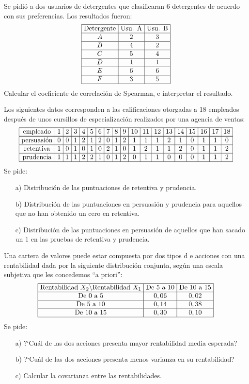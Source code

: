 \documentclass[12pt]{article}
\begin{document}
\begin{prob}
{Se pidió a dos usuarios de detergentes que clasificaran 6
detergentes de acuerdo con sus preferencias. Los resultados
fueron:
$$\vbox{\halign{\offinterlineskip\strut\vrule\ $#$ &\vrule
\ $#$ &\vrule\ $#$ \vrule\cr\noalign{\hrule}
\hbox{Detergente}&\hbox{Usu. A}&\hbox{Usu. B}\cr\noalign{\hrule}
A&2&3\cr\noalign{\hrule}B&4&2\cr\noalign{\hrule}
C&5&4\cr\noalign{\hrule}D&1&1\cr\noalign{\hrule}
E&6&6\cr\noalign{\hrule}F&3&5\cr\noalign{\hrule}}}$$ Calcular el
coeficiente de correlación de Spearman, e interpretar el
resultado.}
\end{prob}

\begin{prob}
{Los siguientes datos corresponden a las calificaciones otorgadas
a 18 empleados después de unos cursillos de especialización
realizados por una agencia de ventas:
$$\vbox{\halign{\offinterlineskip\strut\vrule\ # &\vrule\ $#$
&\vrule\ $#$ &\vrule\ $#$ &\vrule\ $#$ &\vrule\ $#$ &\vrule\ $#$
 &\vrule\ $#$ &\vrule\ $#$ &\vrule\ $#$ &\vrule\ $#$ &\vrule\ $#$
 &\vrule\ $#$ &\vrule\ $#$ &\vrule\ $#$ &\vrule\ $#$ &\vrule\ $#$
 &\vrule\ $#$ &\vrule\ $#$ \vrule\cr\noalign{\hrule}
empleado&1&2&3&4&5&6&7&8&9&10&11&12&13&14&15&16&17&18
\cr\noalign{\hrule}\noalign{\hrule}persuasión&0&0&1&2&1&2&0&1&2&1&1&1&2&1&0&1&1&0
\cr\noalign{\hrule}retentiva&1&0&1&0&1&0&2&1&0&1&2&1&1&2&0&1&1&2
\cr\noalign{\hrule}prudencia&1&1&1&2&2&1&0&1&2&0&1&1&0&0&0&1&1&2
\cr\noalign{\hrule}}}$$ Se pide:
\begin{itemize}
\item[a)] {Distribución de las puntuaciones de retentiva y prudencia.}
\item[b)] {Distribución de las puntuaciones en persuasión y prudencia
para aquellos que no han obtenido un cero en retentiva.}
\item[c)] {Distribución de las puntuaciones en persuasión  de aquellos
que han sacado  un 1 en las pruebas de retentiva y prudencia.}
\end{itemize}
}
\end{prob}

\begin{prob}
{Una cartera de valores puede estar compuesta por dos tipos d e acciones con una
rentabilidad dada por la siguiente distribución conjunta, según una escala subjetiva que
les concedemos ``a priori'':
$$\vbox{\halign{\offinterlineskip\strut\vrule\ $#$ &\vrule
\ $#$ &\vrule\ $#$ \vrule\cr\noalign{\hrule} \hbox{Rentabilidad
$X_2$}\backslash\hbox{Rentabilidad $X_1$}&\hbox{De 5 a
10}&\hbox{De 10 a 15}\cr\noalign{\hrule} \hbox{De 0 a
5}&0,06&0,02\cr\noalign{\hrule}\hbox{De 5 a
10}&0,14&0,38\cr\noalign{\hrule} \hbox{De 10 a
15}&0,30&0,10\cr\noalign{\hrule}}}$$ Se pide:
\begin{itemize}
\item[a)] {?`Cuál  de las dos acciones presenta mayor rentabilidad
media esperada?}
\item[b)] {?`Cuál de las dos acciones presenta menos varianza en su
rentabilidad?}
\item[c)] {Calcular la covarianza entre las rentabilidades.}
\end{itemize}
}
\end{prob}
\end{document}
